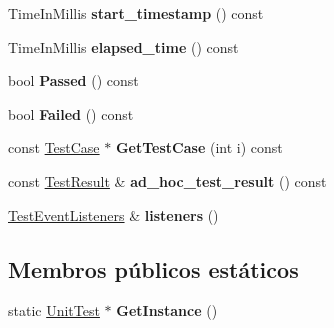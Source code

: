 \begin{DoxyCompactItemize}
\item 
\hypertarget{classtesting_1_1UnitTest_aa7d2853c08558b685df818d47f44a10c}{Time\-In\-Millis {\bfseries start\-\_\-timestamp} () const }\label{classtesting_1_1UnitTest_aa7d2853c08558b685df818d47f44a10c}

\item 
\hypertarget{classtesting_1_1UnitTest_aeff5643edc3624e49085e2850512a7de}{Time\-In\-Millis {\bfseries elapsed\-\_\-time} () const }\label{classtesting_1_1UnitTest_aeff5643edc3624e49085e2850512a7de}

\item 
\hypertarget{classtesting_1_1UnitTest_a4ef49e958702bf741e7eaa4864e28a48}{bool {\bfseries Passed} () const }\label{classtesting_1_1UnitTest_a4ef49e958702bf741e7eaa4864e28a48}

\item 
\hypertarget{classtesting_1_1UnitTest_ad7711156d07d6037d8f497e5c385f78d}{bool {\bfseries Failed} () const }\label{classtesting_1_1UnitTest_ad7711156d07d6037d8f497e5c385f78d}

\item 
\hypertarget{classtesting_1_1UnitTest_a3f324a8067d56044b56cec58d1edf7ac}{const \hyperlink{classtesting_1_1TestCase}{Test\-Case} $\ast$ {\bfseries Get\-Test\-Case} (int i) const }\label{classtesting_1_1UnitTest_a3f324a8067d56044b56cec58d1edf7ac}

\item 
\hypertarget{classtesting_1_1UnitTest_ad9f058c36dab7e276322969160ed6f06}{const \hyperlink{classtesting_1_1TestResult}{Test\-Result} \& {\bfseries ad\-\_\-hoc\-\_\-test\-\_\-result} () const }\label{classtesting_1_1UnitTest_ad9f058c36dab7e276322969160ed6f06}

\item 
\hypertarget{classtesting_1_1UnitTest_aac10085cf7c0d1751306db10cdd953cb}{\hyperlink{classtesting_1_1TestEventListeners}{Test\-Event\-Listeners} \& {\bfseries listeners} ()}\label{classtesting_1_1UnitTest_aac10085cf7c0d1751306db10cdd953cb}

\end{DoxyCompactItemize}
\subsection*{Membros públicos estáticos}
\begin{DoxyCompactItemize}
\item 
\hypertarget{classtesting_1_1UnitTest_a24192400b70b3b946746954e9574fb8e}{static \hyperlink{classtesting_1_1UnitTest}{Unit\-Test} $\ast$ {\bfseries Get\-Instance} ()}\label{classtesting_1_1UnitTest_a24192400b70b3b946746954e9574fb8e}

\end{DoxyCompactItemize}
